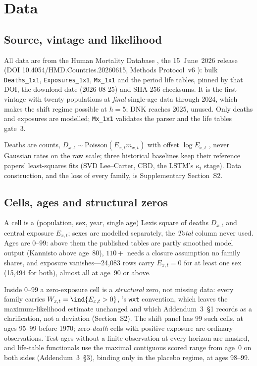\section{Data}
\label{sec:data}

\subsection{Source, vintage and likelihood}

All data are from the Human Mortality Database \citep{hmd2026}, the
15~June~2026 release (DOI 10.4054/HMD.Countries.20260615, Methods
Protocol~v6 \citep{wilmoth2025methods}): bulk \texttt{Deaths\_1x1},
\texttt{Exposures\_1x1}, \texttt{Mx\_1x1} and the period life tables, pinned
by that DOI, the download date (2026-08-25) and SHA-256 checksums. It is the
first vintage with twenty populations at \emph{final} single-age data through
2024, which makes the shift regime possible at $h=5$; DNK reaches 2025,
unused. Only deaths and exposures are modelled; \texttt{Mx\_1x1} validates
the parser and the life tables gate~3.

Deaths are counts, $D_{x,t}\sim\mathrm{Poisson}(E_{x,t}m_{x,t})$ with offset
$\log E_{x,t}$ \citep{brouhns2002poisson}, never Gaussian rates on the raw
scale; three historical baselines keep their reference papers' least-squares
fits (SVD Lee--Carter, CBD, the LSTM's $\kappa_t$ stage). Data construction,
and the loss of every family, is Supplementary Section~S2.

\subsection{Cells, ages and structural zeros}

A cell is a (population, sex, year, single age) Lexis square of deaths
$D_{x,t}$ and central exposure $E_{x,t}$; sexes are modelled separately, the
\emph{Total} column never used. Ages are $0$--$99$: above them the published
tables are partly smoothed model output (Kannisto above age~80), $110{+}$
needs a closure assumption no family shares, and exposure vanishes---24{,}083
rows carry $E_{x,t}=0$ for at least one sex (15{,}494 for both), almost all
at age~90 or above.

Inside $0$--$99$ a zero-exposure cell is a \emph{structural} zero, not missing
data: every family carries $W_{x,t}=\ind\{E_{x,t}>0\}$, 's
\texttt{wxt} convention, which leaves the maximum-likelihood estimate
unchanged and which Addendum~3~\S1 records as a clarification, not a
deviation (Section~S2). The shift panel has 99 such cells, at ages 95--99
before 1970; zero-\emph{death} cells with positive exposure are ordinary
observations. Test ages without a finite observation at every horizon are
masked, and life-table functionals use the maximal contiguous scored range
from age~0 on both sides (Addendum~3~\S3), binding only in the placebo
regime, at ages 98--99.

